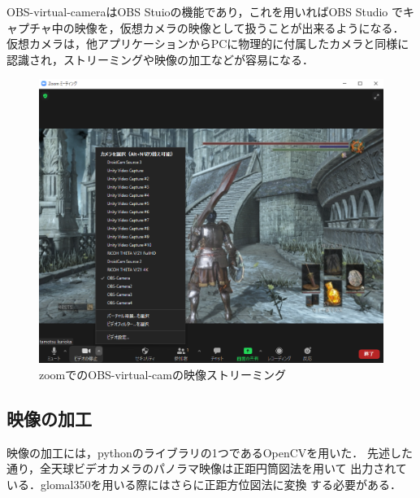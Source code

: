 OBS-virtual-cameraはOBS Stuioの機能であり，これを用いればOBS Studio
でキャプチャ中の映像を，仮想カメラの映像として扱うことが出来るようになる．
仮想カメラは，他アプリケーションからPCに物理的に付属したカメラと同様に
認識され，ストリーミングや映像の加工などが容易になる．

\begin{figure}[tp]
  \centering
  \includegraphics[scale=0.5]{fig/streaming.png}
  \caption{zoomでのOBS-virtual-camの映像ストリーミング}
\end{figure}

\subsection*{映像の加工}
映像の加工には，pythonのライブラリの1つであるOpenCVを用いた．
先述した通り，全天球ビデオカメラのパノラマ映像は正距円筒図法を用いて
出力されている．glomal350を用いる際にはさらに正距方位図法に変換
する必要がある．

